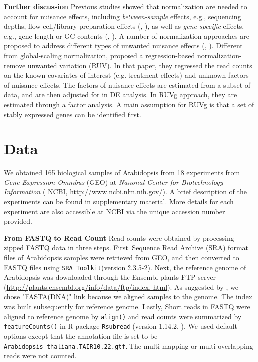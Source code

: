 \documentclass[11pt, a4paper]{article}
\begin{document}
{\bf Further discussion} Previous studies showed that normalization are needed
to account for nuisance effects, including \textit{between-sample} effects,
e.g., sequencing depths, flow-cell/library preparation effects
(\cite{bullard2010evaluation}, \cite{robinson2010scaling}), as well as
\textit{gene-specific} effects, e.g.,  gene length or GC-contents
(\cite{risso2011gc}, \cite{hansen2012removing}). A number of normalization
approaches are proposed to address different types of unwanted nuisance
effects (\cite{dillies2013comprehensive}, \cite{risso2014nat}). Different from
global-scaling normalization, \cite{risso2014nat}  proposed a regression-based
normalization-remove unwanted variation (RUV).  In that paper, they regressed
the read counts on the known covariates of interest (e.g. treatment effects)
and unknown factors of nuisance effects. The factors of nuisance effects are
estimated from a subset of data, and are then adjusted for in DE analysis. In
RUVg approach, they are estimated through a factor analysis. A main assumption
for RUVg is that a set of stably expressed genes can be identified first.

\section{Data}
 We obtained 165 biological samples of Arabidopsis  from 18 experiments from \textit{Gene Expression Omnibus} (GEO) at \textit{National Center for Biotechnology Information}  ( NCBI, \url{http://www.ncbi.nlm.nih.gov/}).  A brief description of the experiments can be found in supplementary material. More details for each experiment are also accessible at NCBI via the unique accession number provided.
 
\textbf{From FASTQ to Read Count} Read counts were obtained by processing
zipped FASTQ data in three steps. First, Sequence Read Archive (SRA) format
files of Arabidopsis samples were retrieved from GEO, and then converted to
FASTQ files using \verb"SRA Toolkit"(version 2.3.5-2). Next, the reference
genome of Arabidopsis was downloaded  through the Ensembl plants FTP server
(\url{http://plants.ensembl.org/info/data/ftp/index. html}). As suggested by
\cite{anders2013count},  we chose "FASTA(DNA)" link because we aligned samples 
to the genome.
The index  was built subsequently for reference genome.  Lastly, Short reads
in FASTQ were  aligned to reference genome by  \verb"align()" and read counts
were summarized by \verb"featureCounts()" in R package \verb"Rsubread"
(version 1.14.2,  \cite{liao2013subread}). We used default options except that
the annotation file is set to be \verb"Arabidopsis_thaliana.TAIR10.22.gtf".
The multi-mapping or multi-overlapping reads were not counted.  
\end{document}
